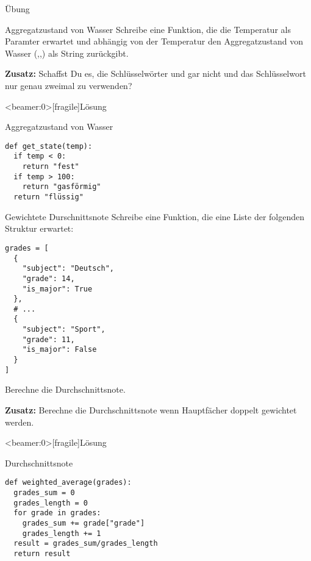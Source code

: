 \begin{frame}{Übung}
\begin{block}{Aggregatzustand von Wasser}
\vspace{2pt}
Schreibe eine Funktion, die die Temperatur als Paramter erwartet und abhängig von der Temperatur den Aggregatzustand von Wasser (,,) als String zurückgibt. 
\pause 

\textbf{Zusatz:} Schaffst Du es, die Schlüsselwörter  und  gar nicht und das Schlüsselwort  nur genau zweimal zu verwenden? 
\end{block}
\end{frame}

\begin{frame}<beamer:0>[fragile]{Lösung}

\begin{solutionblock}{Aggregatzustand von Wasser}
\begin{verbatim}
def get_state(temp):
  if temp < 0:
    return "fest"
  if temp > 100:
    return "gasförmig"
  return "flüssig"
\end{verbatim}
\end{solutionblock}

\end{frame}


\begin{fragile}

\begin{block}{Gewichtete Durschnittsnote}
	\vspace{2pt}
Schreibe eine Funktion, die eine Liste der folgenden Struktur erwartet: 

\begin{verbatim}
grades = [ 
  { 
    "subject": "Deutsch", 
    "grade": 14,
    "is_major": True
  },
  # ... 
  {
    "subject": "Sport",
    "grade": 11, 
    "is_major": False
  }
]
\end{verbatim}

Berechne die Durchschnittsnote. 

\textbf{Zusatz:} Berechne die Durchschnittsnote wenn Hauptfächer doppelt gewichtet werden. 
\end{block}

\end{fragile}


\begin{frame}<beamer:0>[fragile]{Lösung}

\begin{solutionblock}{Durchschnittsnote}
\begin{verbatim}
def weighted_average(grades): 
  grades_sum = 0
  grades_length = 0
  for grade in grades: 
    grades_sum += grade["grade"]
    grades_length += 1
  result = grades_sum/grades_length
  return result 
\end{verbatim}
\end{solutionblock}

\end{frame}



